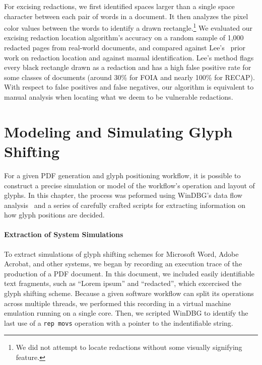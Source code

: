 For excising redactions, we first identified spaces larger than a single space character between each pair of words in a document.
It then analyzes the pixel color values between the words to identify a drawn rectangle.\footnote{
    We did not attempt to locate redactions without some visually signifying feature.
}
We evaluated our excising redaction location algorithm's accuracy on a random sample of 1,000 redacted pages from real-world documents, and compared against Lee's~\cite{timblee} prior work on redaction location and against manual identification.
Lee's method flags every black rectangle drawn as a redaction and has a high false positive rate for some classes of documents (around 30\% for FOIA and nearly 100\% for RECAP).
With respect to false positives and false negatives, our algorithm is equivalent to manual analysis when locating what we deem to be vulnerable redactions.

\section{Modeling and Simulating Glyph Shifting}

For a given PDF generation and glyph positioning workflow, it is possible to construct a precise simulation or model of the workflow's operation and layout of glyphs.
In this chapter, the process was peformed using WinDBG's data flow analysis~\cite{timetravel} and a series of carefully crafted scripts for extracting information on how glyph positions are decided.

\paragraph{Extraction of System Simulations}
To extract simulations of glyph shifting schemes for Microsoft Word, Adobe Acrobat, and other systems, we began by recording an execution trace of the production of a PDF document.
In this document, we included easily identifiable text fragments, such as ``Lorem ipsum'' and ``redacted'', which excercised the glyph shifting scheme.
Because a given software workflow can split its operations across multiple threads, we performed this recording in a virtual machine emulation running on a single core.
Then, we scripted WinDBG to identify the last use of a \texttt{rep movs} operation with a pointer to the indentifiable string.


